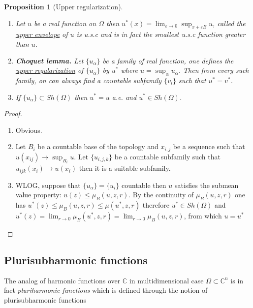 \documentclass[11pt]{article}
\newtheorem{proposition}{Proposition}[theorem]
\begin{document}
\begin{proposition}[Upper regularization]
\label{prop:upper-regularization}
\begin{enumerate}
\item Let \(u\) be a real function on \(\Omega\) then \(u^*(x) = \lim_{\varepsilon\to 0}
   \sup_{x+\varepsilon B} u\), called the \uline{upper envelope} of \(u\) is u.s.c and is in
fact the smallest u.s.c function greater than \(u\).
\item \textbf{Choquet lemma.} Let \(\{u_\alpha\}\) be a family of real function, one defines the
\uline{upper regularization} of \(\{ u_\alpha\}\) by \(u^*\) where \(u=\sup_\alpha u_\alpha\). Then from every such family, on can always find a countable subfamily \(\{v_i\}\)
such that \(u^* = v^*\).
\item If \(\{u_{\alpha}\} \subset Sh(\Omega)\) then \(u^* = u\) a.e. and \(u^*\in Sh(\Omega)\).
\end{enumerate}
\end{proposition}
\begin{proof}
\begin{enumerate}
\item Obvious.
\item Let \(B_i\) be a countable base of the topology and \(x_{i,j}\) be a sequence such
that \(u(x_{ij}) \to \sup_{B_i}u\). Let \(\{ u_{i,j,k} \}\) be a countable subfamily
such that \(u_{ijk}(x_i) \to u(x_i)\) then it is a suitable subfamily.
\item WLOG, suppose that \(\{u_\alpha\} = \{u_i\}\) countable then \(u\) satisfies the
submean value property: \(u(z)\leq \mu_B(u,z,r)\). By the continuity of \(\mu_B(u,z,r)\) one has \(u^*(z)\leq \mu_B(u,z,r)\leq \mu(u^*,z,r)\) therefore \(u^*\in
   Sh(\Omega)\) and \(u^*(z) = \lim_{r\to 0} \mu_B(u^*,z,r) = \lim_{r\to 0}\mu_B(u,z,r)\), from which \(u=u^*\)
\end{enumerate}
\end{proof}

\subsection{Plurisubharmonic functions}
\label{sec:orga785aec}

The analog of harmonic functions over \(\mathbb{C}\) in multidimensional case \(\Omega\subset \mathbb{C}^n\) is in fact
\emph{pluriharmonic functions} which is defined through the notion of plurisubharmonic functions
\end{document}

